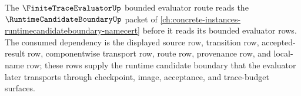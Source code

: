 The $\FiniteTraceEvaluatorUp$ bounded evaluator route reads the $\RuntimeCandidateBoundaryUp$ packet of \autoref{ch:concrete-instances-runtimecandidateboundary-namecert} before it reads its bounded evaluator rows. The consumed dependency is the displayed source row, transition row, accepted-result row, componentwise transport row, route row, provenance row, and local-name row; these rows supply the runtime candidate boundary that the evaluator later transports through checkpoint, image, acceptance, and trace-budget surfaces.
